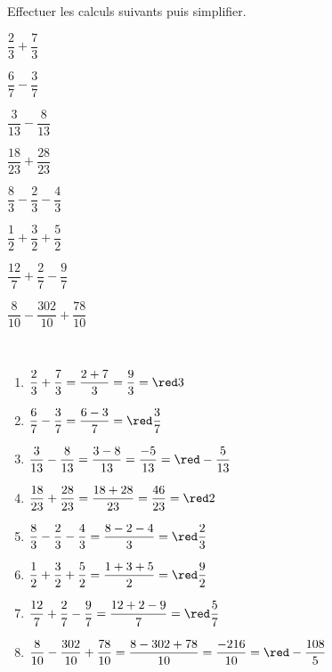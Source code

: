 \begin{exercice*}
   Effectuer les calculs suivants puis simplifier.   
      \begin{multicols}{3}
         \begin{enumerate}
            \begin{spacing}{2}
               \item $\dfrac23+\dfrac73$
               \item $\dfrac67-\dfrac37$
               \item $\dfrac3{13}-\dfrac8{13}$
               \item $\dfrac{18}{23}+\dfrac{28}{23}$
               \item $\dfrac83-\dfrac23-\dfrac43$ 
               \item $\dfrac12+\dfrac32+\dfrac52$
               \item $\dfrac{12}7+\dfrac27-\dfrac97$
               \item $\dfrac8{10}-\dfrac{302}{10}+\dfrac{78}{10}$
            \end{spacing}
         \end{enumerate}
      \end{multicols}
\end{exercice*}

\begin{corrige}
   \ \\ [-5mm]
   \begin{enumerate}
      \item $\dfrac23+\dfrac73 =\dfrac{2+7}{3} =\dfrac93 =\red 3$ \medskip
      \item $\dfrac67-\dfrac37 =\dfrac{6-3}{7} =\red \dfrac37$ \medskip
      \item $\dfrac3{13}-\dfrac8{13} =\dfrac{3-8}{13} =\dfrac{-5}{13} =\red -\dfrac{5}{13}$ \medskip
      \item $\dfrac{18}{23}+\dfrac{28}{23} =\dfrac{18+28}{23} =\dfrac{46}{23} =\red 2$ \medskip
      \item $\dfrac83-\dfrac23-\dfrac43 =\dfrac{8-2-4}{3} =\red \dfrac23$ \medskip
      \item $\dfrac12+\dfrac32+\dfrac52 =\dfrac{1+3+5}{2} =\red \dfrac92$ \medskip
      \item $\dfrac{12}7+\dfrac27-\dfrac97 =\dfrac{12+2-9}{7} =\red \dfrac{5}{7}$ \medskip
      \item $\dfrac8{10}-\dfrac{302}{10}+\dfrac{78}{10} =\dfrac{8-302+78}{10} =\dfrac{-216}{10} =\red -\dfrac{108}{5}$
   \end{enumerate}
\end{corrige}